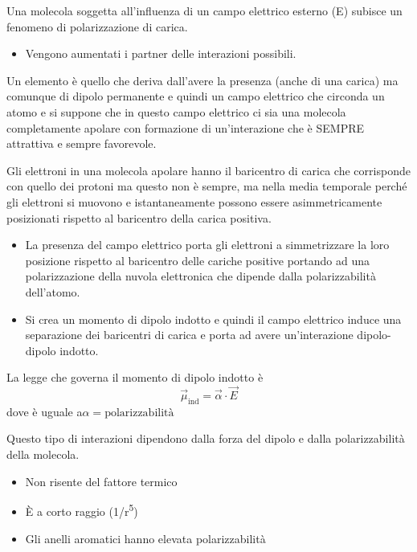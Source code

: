 Una molecola soggetta all'influenza di un campo elettrico esterno (E)
subisce un fenomeno di polarizzazione di carica.

\begin{itemize}
\item
  Vengono aumentati i partner delle interazioni possibili.
\end{itemize}

Un elemento è quello che deriva dall'avere la presenza (anche di una
carica) ma comunque di dipolo permanente e quindi un campo elettrico che
circonda un atomo e si suppone che in questo campo elettrico ci sia una
molecola completamente apolare con formazione di un'interazione che è
SEMPRE attrattiva e sempre favorevole.

Gli elettroni in una molecola apolare hanno il baricentro di carica che
corrisponde con quello dei protoni ma questo non è sempre, ma nella
media temporale perché gli elettroni si muovono e istantaneamente
possono essere asimmetricamente posizionati rispetto al baricentro della
carica positiva.

\begin{itemize}
\item
  La presenza del campo elettrico porta gli elettroni a simmetrizzare la
  loro posizione rispetto al baricentro delle cariche positive portando
  ad una polarizzazione della nuvola elettronica che dipende dalla
  polarizzabilità dell'atomo.
\item
  Si crea un momento di dipolo indotto e quindi il campo elettrico
  induce una separazione dei baricentri di carica e porta ad avere
  un'interazione dipolo-dipolo indotto.
\end{itemize}


La legge che governa il momento di dipolo indotto è
\[
  \vec{\mu}_{\text{ind}} = \vec{\alpha} \cdot \vec{E}
\]
dove \alpha{} è uguale a\( \alpha = \text{polarizzabilità}\)

Questo tipo di interazioni dipendono dalla forza del dipolo e dalla
polarizzabilità della molecola.

\begin{itemize}
\item
  Non risente del fattore termico
\item
  È a corto raggio (1/r\textsuperscript{5})
\item
  Gli anelli aromatici hanno elevata polarizzabilità
\end{itemize}

